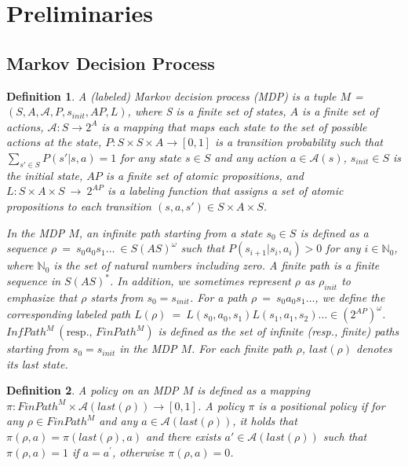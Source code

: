 \documentclass[letterpaper, 10 pt, conference]{ieeeconf}  %
\newtheorem{definition}{Definition}
\begin{document}
\section{Preliminaries}

\subsection{Markov Decision Process}

\begin{definition}
A (labeled) Markov decision process (MDP) is a tuple $M$ = $(S, A, \mathcal{A}, P, s_{init}, AP, L)$, where S is a finite set of states, $A$ is a finite set of actions, $\mathcal{A} : S \rightarrow 2^A$ is a mapping that maps each state to the set of possible actions at the state, $P:S \times S \times A \rightarrow [0,1]$ is a transition probability such that $\sum_{s' \in S} P(s'|s,a) = 1$ for any state $s \in S$ and any action $a \in \mathcal{A}(s) $, $s_{init} \in S$ is the initial state, $AP$ is a finite set of atomic propositions, and $L : S \times A \times S\ \rightarrow\ 2^{AP}$ is a labeling function that assigns a set of atomic propositions to each transition $(s, a, s') \in S \times A \times S$.

In the MDP $M$, an infinite path starting from a state $s_0 \in S$ is defined as a sequence $\rho\ =\ s_0a_0s_1 \ldots\ \in S (A S)^{\omega}$ such that $P(s_{i+1}|s_i, a_i) > 0$ for any $ i \in \mathbb{N}_0$, where $\mathbb{N}_0$ is the set of natural numbers including zero.  A finite path is a finite sequence in $S (A S)^*$. In addition, we sometimes represent $\rho$ as $\rho_{init}$ to emphasize that $\rho$ starts from $s_0 = s_{init}$.
For a path $\rho\ =\ s_0a_0s_1 \ldots$, we define the corresponding labeled path $L(\rho)\ =\ L(s_0,a_0,s_1)L(s_1,a_1,s_2) \ldots \in (2^{AP})^{\omega}$. $InfPath^{M}\ ( \text{resp., }FinPath^{M})$ is defined as the set of infinite (resp., finite) paths starting from $s_0=s_{init}$ in the MDP $M$. For each finite path $\rho$, $last(\rho)$ denotes its last state.
\end{definition}

\begin{definition}
  A policy on an MDP $M$ is defined as a mapping $\pi:FinPath^{M} \times \mathcal{A}(last(\rho)) \rightarrow [0,1]$. A policy $\pi$ is a {\it positional} policy if for any $ \rho \in FinPath^{M}$ and any $ a \in \mathcal{A}(last(\rho))$, it holds that $\pi(\rho, a)=\pi(last(\rho),a)$ and there exists $ a' \in \mathcal{A}(last(\rho))$ such that $\pi(\rho, a) = 1$ if $a=a^{\prime}$, otherwise $\pi(\rho, a) = 0$.

\end{definition}
\end{document}

